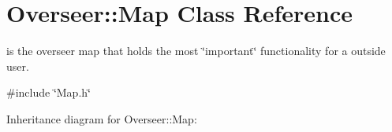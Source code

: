 \hypertarget{classOverseer_1_1Map}{}\section{Overseer\+:\+:Map Class Reference}
\label{classOverseer_1_1Map}


is the overseer map that holds the most \char`\"{}important\char`\"{} functionality for a outside user.  




{\ttfamily \#include \char`\"{}Map.\+h\char`\"{}}



Inheritance diagram for Overseer\+:\+:Map\+:
